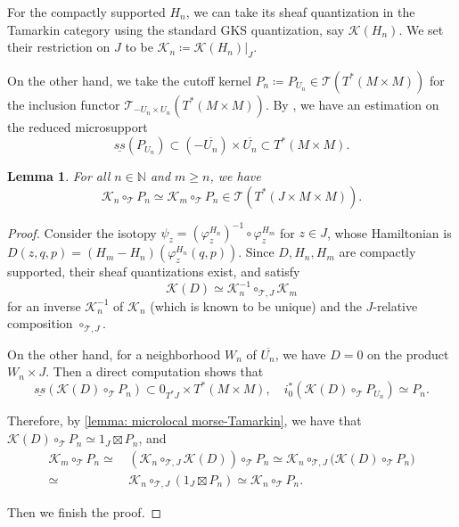 \documentclass[11pt]{amsart}
\numberwithin{equation}{section}
\theoremstyle{plain}
\newtheorem{Lemma}[lemma]{Lemma}
\theoremstyle{definition}
\theoremstyle{remark}
\newcommand{\bN} { {\mathbb{N}}}
\newcommand{\cK} { {\mathcal{K}}}
\newcommand{\sT} { {\mathscr{T}}}
\begin{document}
For the compactly supported $H_n$, we can take its sheaf quantization in the Tamarkin category using the standard GKS quantization, say $\cK(H_n)$. We set their restriction on $J$ to be $\cK_n\coloneqq \cK(H_n)|_{J}$.

On the other hand, we take the cutoff kernel $P_n\coloneqq P_{U_n}\in \sT(T^*(M\times M))$ for the inclusion functor $\sT_{-U_n \times U_n}(T^*(M \times M))$. By \cite[Proposition 4.5]{zhang-cutoff}, we have an estimation on the reduced microsupport
\begin{equation}\label{equation: estimation of PU}
\underline{ss}(P_{U_n})\subset (-\overline{U_n})\times \overline{U_n} \subset T^*(M \times M). 
\end{equation}
 

\begin{Lemma}\label{Lemma: continuation of microlocal kernels}For all $n\in \bN$ and $m\geq n$, we have
\[\cK_n\circ_{\sT} P_n\simeq \cK_{m}\circ_{\sT} P_n \in \sT(T^*(J\times M\times M)).\]    
\end{Lemma}
\begin{proof}Consider the isotopy $\psi_z=(\varphi^{H_n}_z)^{-1}\circ \varphi^{H_m}_z$ for $z\in J$, whose Hamiltonian is $D(z,q,p)=(H_m-H_n)(\varphi^{H_n}_z(q,p))$. 
Since $D,H_n,H_m$ are compactly supported, their sheaf quantizations exist, and satisfy 
\[\cK(D)\simeq \cK_n^{-1}\circ_{\sT,J} \cK_m\]
for an inverse $\cK_n^{-1}$ of $\cK_n$ (which is known to be unique) and the $J$-relative composition $\circ_{\sT,J}$.

On the other hand, for a neighborhood $W_n$ of $\overline{U_n}$, we have $D=0$ on the product $W_n \times J$. Then a direct computation shows that
\[\underline{ss}(\cK(D)\circ_{\sT} P_{n})\subset 0_{T^*J}\times T^*(M\times M),\quad i_0^*(\cK(D)\circ_{\sT} P_{U_n})\simeq P_{n}.\]

Therefore, by \autoref{lemma: microlocal morse-Tamarkin}, we have that $\cK(D)\circ_{\sT} P_{n}\simeq 1_{J}\boxtimes P_{n}$, and 
\[
\begin{aligned}
\cK_m\circ_\sT P_n{\simeq}&\,
(\cK_n\circ_{\sT,J}\cK(D))\circ_{\sT}P_n
\simeq
\cK_n\circ_{\sT,J}\bigl(\cK(D)\circ_{\sT}P_n\bigr) \\
\simeq &\,
\cK_n\circ_{\sT,J}(1_J\boxtimes P_n) \simeq \cK_n\circ_{\sT} P_n.
\end{aligned}
\]

Then we finish the proof.
\end{proof}
\end{document}
